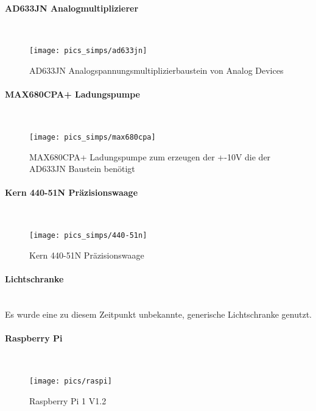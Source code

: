 \documentclass[12pt,a4paper]{article}
\begin{document}
\paragraph{AD633JN Analogmultiplizierer}\mbox{}\\
\begin{figure}[h!]
	\centering
	\texttt{[image: pics\_simps/ad633jn]}
	\caption{AD633JN Analogspannungsmultiplizierbaustein von Analog Devices}
\end{figure}
%
\paragraph{MAX680CPA+ Ladungspumpe}\mbox{}\\
\begin{figure}[h!]
	\centering
	\texttt{[image: pics\_simps/max680cpa]}
	\caption{MAX680CPA+ Ladungspumpe zum erzeugen der +-10V die der AD633JN Baustein benötigt}
\end{figure}
%
\newpage
\paragraph{Kern 440-51N Präzisionswaage}\mbox{}\\
\begin{figure}[h!]
	\centering
	\texttt{[image: pics\_simps/440-51n]}
	\caption{Kern 440-51N Präzisionswaage}
\end{figure}
%
\paragraph{Lichtschranke}\mbox{}\\
Es wurde eine zu diesem Zeitpunkt unbekannte, generische Lichtschranke genutzt.
%
\paragraph{Raspberry Pi}\mbox{}\\
\begin{figure}[h!]
	\centering
	\texttt{[image: pics/raspi]}
	\caption{Raspberry Pi 1 V1.2}
\end{figure}
%
%
\clearpage\vfill\newpage{}
\end{document}
